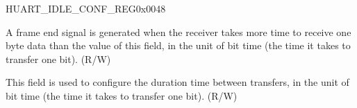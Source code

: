 \begin{register}{H}{UART\_IDLE\_CONF\_REG}{0x0048}\label{regdesc:UARTIDLECONFREG}
%
%
%
\regnewline%
\begin{regdesc}\begin{reglist}
\label{fielddesc:UARTRXIDLETHRHD}\item [UART\_RX\_IDLE\_THRHD] A frame end signal is generated when the receiver takes more time to receive one byte data than the value of this field, in the unit of bit time (the time it takes to transfer one bit). (R/W)
\label{fielddesc:UARTTXIDLENUM}\item [UART\_TX\_IDLE\_NUM] This field is used to configure the duration time between transfers, in the unit of bit time (the time it takes to transfer one bit). (R/W)
\end{reglist}\end{regdesc}
\end{register}


